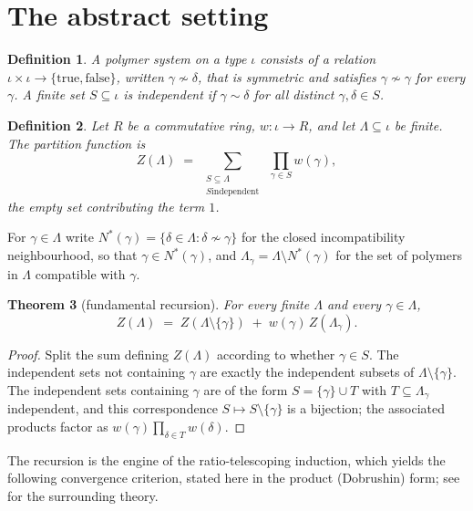 \documentclass[11pt]{amsart}
\newtheorem{theorem}{Theorem}[section]
\newtheorem{definition}[theorem]{Definition}
\begin{document}
\section{The abstract setting}

\begin{definition}
A \emph{polymer system} on a type $\iota$ consists of a relation
$\iota \times \iota \to \{\mathrm{true},\mathrm{false}\}$, written
$\gamma \nsim \delta$, that is symmetric and satisfies
$\gamma \nsim \gamma$ for every $\gamma$. A finite set
$S \subseteq \iota$ is \emph{independent} if $\gamma \sim \delta$ for all
distinct $\gamma, \delta \in S$.
\end{definition}

\begin{definition}
Let $R$ be a commutative ring, $w \colon \iota \to R$, and let
$\Lambda \subseteq \iota$ be finite. The \emph{partition function} is
\[
  Z(\Lambda) \;=\; \sum_{\substack{S \subseteq \Lambda \\ S \text{
  independent}}} \; \prod_{\gamma \in S} w(\gamma),
\]
the empty set contributing the term $1$.
\end{definition}

For $\gamma \in \Lambda$ write
$N^*(\gamma) = \{\delta \in \Lambda : \delta \nsim \gamma\}$ for the closed
incompatibility neighbourhood, so that $\gamma \in N^*(\gamma)$, and
$\Lambda_\gamma = \Lambda \setminus N^*(\gamma)$ for the set of polymers in
$\Lambda$ compatible with $\gamma$.

\begin{theorem}[fundamental recursion]\label{thm:rec}
For every finite $\Lambda$ and every $\gamma \in \Lambda$,
\[
  Z(\Lambda) \;=\; Z(\Lambda \setminus \{\gamma\})
  \;+\; w(\gamma)\, Z(\Lambda_\gamma).
\]
\end{theorem}

\begin{proof}
Split the sum defining $Z(\Lambda)$ according to whether $\gamma \in S$.
The independent sets not containing $\gamma$ are exactly the independent
subsets of $\Lambda \setminus \{\gamma\}$. The independent sets containing
$\gamma$ are of the form $S = \{\gamma\} \cup T$ with
$T \subseteq \Lambda_\gamma$ independent, and this correspondence
$S \mapsto S \setminus \{\gamma\}$ is a bijection; the associated products
factor as $w(\gamma) \prod_{\delta \in T} w(\delta)$.
\end{proof}

The recursion is the engine of the ratio-telescoping induction, which
yields the following convergence criterion, stated here in the product
(Dobrushin) form; see \cite{SS05} for the surrounding theory.
\end{document}
